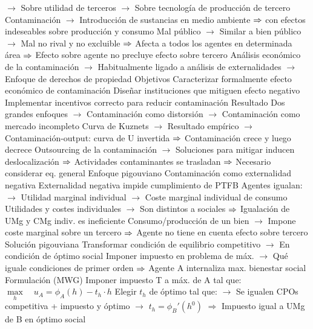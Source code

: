 \documentclass{nuevotema}
\begin{document}
\begin{esquemal}
				\4[] $\to$ Sobre utilidad de terceros
				\4[] $\to$ Sobre tecnología de producción de tercero
				\4[] Contaminación
				\4[] $\to$ Introducción de sustancias en medio ambiente
				\4[] $\Rightarrow$ con efectos indeseables sobre producción y consumo
				\4[] Mal público
				\4[] $\to$ Similar a bien público
				\4[] $\to$ Mal no rival y no excluible
				\4[] $\Rightarrow$ Afecta a todos los agentes en determinada área
				\4[] $\Rightarrow$ Efecto sobre agente no precluye efecto sobre tercero
				\4[] Análisis económico de la contaminación
				\4[] $\to$ Habitualmente ligado a análisis de externalidades
				\4[] $\to$ Enfoque de derechos de propiedad
				\4 Objetivos
				\4[] Caracterizar formalmente efecto económico de contaminación
				\4[] Diseñar instituciones que mitiguen efecto negativo
				\4[] Implementar incentivos correcto para reducir contaminación
				\4 Resultado
				\4[] Dos grandes enfoques
				\4[] $\to$ Contaminación como distorsión
				\4[] $\to$ Contaminación como mercado incompleto
				\4[] Curva de Kuznets
				\4[] $\to$ Resultado empírico
				\4[] $\to$ Contaminación-output: curva de U invertida
				\4[] $\Rightarrow$ Contaminación crece y luego decrece
				\4[] Outsourcing de la contaminación
				\4[] $\to$ Soluciones para mitigar inducen deslocalización
				\4[] $\Rightarrow$ Actividades contaminantes se trasladan
				\4[] $\Rightarrow$ Necesario considerar eq. general
			\3 Enfoque pigouviano
				\4 Contaminación como externalidad negativa
				\4 Externalidad negativa impide cumplimiento de PTFB
				\4[] Agentes igualan:
				\4[] $\to$ Utilidad marginal individual
				\4[] $\to$ Coste marginal individual de consumo
				\4[] Utilidades y costes individuales
				\4[] $\to$ Son distintos a sociales
				\4[] $\Rightarrow$ Igualación de UMg y CMg indiv. es ineficiente
				\4[] Consumo/producción de un bien
				\4[] $\to$ Impone coste marginal sobre un tercero
				\4[] $\Rightarrow$ Agente no tiene en cuenta efecto sobre tercero
				\4 Solución pigouviana
				\4[] Transformar condición de equilibrio competitivo
				\4[] $\to$ En condición de óptimo social
				\4 Imponer impuesto en problema de máx.
				\4[] $\to$ Qué iguale condiciones de primer orden
				\4[] $\Rightarrow$ Agente A internaliza max. bienestar social
				\4 Formulación (MWG)
				\4[] Imponer impuesto T a máx. de A tal que:
				\4[] $\underset{h}{\max} \quad u_A = \phi_A(h) - t_h \cdot h $
				\4[] 
				\4[] Elegir $t_h$ de óptimo tal que:
				\4[] $\to$ Se igualen CPOs competitiva + impuesto y óptimo
				\4[] $\to$ $t_h = \phi_B'(h^0)$
				\4[] $\Rightarrow$ Impuesto igual a UMg de B en óptimo social

\end{esquemal}
\end{document}
